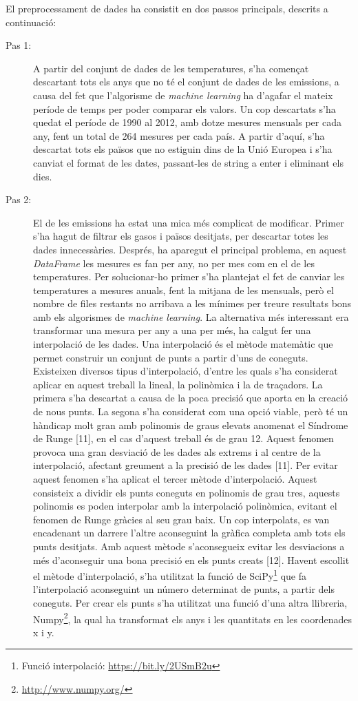 \documentclass[10pt,a4paper,twocolumn,twoside]{article}
\begin{document}
El preprocessament de dades ha consistit en dos passos principals, descrits a continuació:
\begin{description}
\item[Pas 1:] A partir del conjunt de dades de les temperatures, s'ha començat descartant tots els anys que no té el conjunt de dades de les emissions, a causa del fet que l'algorisme de  \textit{machine learning} ha d'agafar el mateix període de temps per poder comparar els valors. Un cop descartats s'ha quedat el període de 1990 al 2012, amb dotze mesures mensuals per cada any, fent un total de 264 mesures per cada país. A partir d'aquí, s'ha descartat tots els països que no estiguin dins de la Unió Europea i s'ha canviat el format de les dates, passant-les de string a enter i eliminant els dies.
\item[Pas 2:]  El de les emissions ha estat una mica més complicat de modificar. Primer s'ha hagut de filtrar els gasos i països desitjats, per descartar totes les dades innecessàries. Després, ha aparegut el principal problema, en aquest \textit{DataFrame} les mesures es fan per any, no per mes com en el de les temperatures. Per solucionar-ho primer s'ha plantejat el fet de canviar les temperatures a mesures anuals, fent la mitjana de les mensuals, però el nombre de files restants no arribava a les mínimes per treure resultats bons amb els algorismes de \textit{machine learning}. La alternativa més interessant era transformar una mesura per any a una per més, ha calgut fer una interpolació de les dades.
Una interpolació és el mètode matemàtic que permet construir un conjunt de punts a partir d'uns de coneguts. Existeixen diversos tipus d'interpolació, d'entre les quals s'ha considerat aplicar en aquest treball la lineal, la polinòmica i la de traçadors. La primera s'ha descartat a causa de la poca precisió que aporta en la creació de nous punts. La segona s'ha considerat com una opció viable, però té un hàndicap molt gran amb polinomis de graus elevats anomenat el Síndrome de Runge [11], en el cas d'aquest treball és de grau 12. Aquest fenomen provoca una gran desviació de les dades als extrems i al centre de la interpolació, afectant greument a la precisió de les dades [11]. Per evitar aquest fenomen s'ha aplicat el tercer mètode d'interpolació. Aquest consisteix a dividir els punts coneguts en polinomis de grau tres, aquests polinomis es poden interpolar amb la interpolació polinòmica, evitant el fenomen de Runge gràcies al seu grau baix. Un cop interpolats, es van encadenant un darrere l'altre aconseguint la gràfica completa amb tots els punts desitjats. Amb aquest mètode s'aconsegueix evitar les desviacions a més d'aconseguir una bona precisió en els punts creats [12]. Havent escollit el mètode d'interpolació, s'ha utilitzat la funció de SciPy\footnote{Funció interpolació: \url{https://bit.ly/2USmB2u}} que fa l'interpolació aconseguint un número determinat de punts, a partir dels coneguts. Per crear els punts s'ha utilitzat una funció d'una altra llibreria, Numpy\footnote{\url{http://www.numpy.org/}}, la qual ha transformat els anys i les quantitats en les coordenades x i y.
\end{description}
\end{document}
